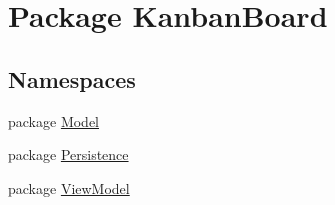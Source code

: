 \hypertarget{namespace_kanban_board}{}\section{Package Kanban\+Board}
\label{namespace_kanban_board}
\subsection*{Namespaces}
\begin{DoxyCompactItemize}
\item 
package \hyperlink{namespace_kanban_board_1_1_model}{Model}
\item 
package \hyperlink{namespace_kanban_board_1_1_persistence}{Persistence}
\item 
package \hyperlink{namespace_kanban_board_1_1_view_model}{View\+Model}
\end{DoxyCompactItemize}
